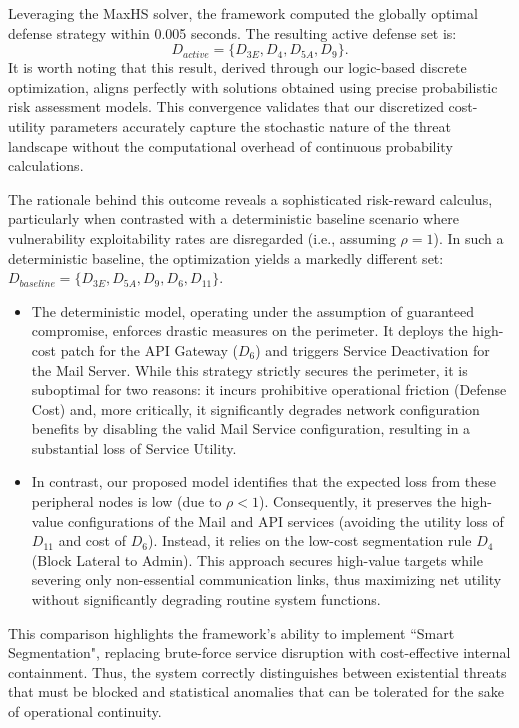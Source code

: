 \documentclass[conference]{IEEEtran}
\theoremstyle{definition} %
\theoremstyle{plain} %
\begin{document}
Leveraging the MaxHS solver, the framework computed the globally optimal defense strategy within 0.005 seconds. The resulting active defense set is:
\begin{equation}
    D_{active} = \{ D_{3E},D_4, D_{5A}, D_9 \}.
\end{equation}
It is worth noting that this result, derived through our logic-based discrete optimization, aligns perfectly with solutions obtained using precise probabilistic risk assessment models. This convergence validates that our discretized cost-utility parameters accurately capture the stochastic nature of the threat landscape without the computational overhead of continuous probability calculations.

The rationale behind this outcome reveals a sophisticated risk-reward calculus, particularly when contrasted with a deterministic baseline scenario where vulnerability exploitability rates are disregarded (i.e., assuming $\rho = 1$). In such a deterministic baseline, the optimization yields a markedly different set: $D_{baseline} = \{  D_{3E}, D_{5A}, D_9, D_6, D_{11} \}$.
\begin{itemize}
    \item The deterministic model, operating under the assumption of guaranteed compromise, enforces drastic measures on the perimeter. It deploys the high-cost patch for the API Gateway ($D_6$) and triggers Service Deactivation for the Mail Server. While this strategy strictly secures the perimeter, it is suboptimal for two reasons: it incurs prohibitive operational friction (Defense Cost) and, more critically, it significantly degrades network configuration benefits by disabling the valid Mail Service configuration, resulting in a substantial loss of Service Utility.
    \item In contrast, our proposed model identifies that the expected loss from these peripheral nodes is low (due to $\rho < 1$). Consequently, it preserves the high-value configurations of the Mail and API services (avoiding the utility loss of $D_{11}$ and cost of $D_6$). Instead, it relies on the low-cost segmentation rule $D_4$ (Block Lateral to Admin). This approach secures high-value targets while severing only non-essential communication links, thus maximizing net utility without significantly degrading routine system functions.
\end{itemize}

This comparison highlights the framework's ability to implement ``Smart Segmentation", replacing brute-force service disruption with cost-effective internal containment. Thus, the system correctly distinguishes between existential threats that must be blocked and statistical anomalies that can be tolerated for the sake of operational continuity.
\end{document}
